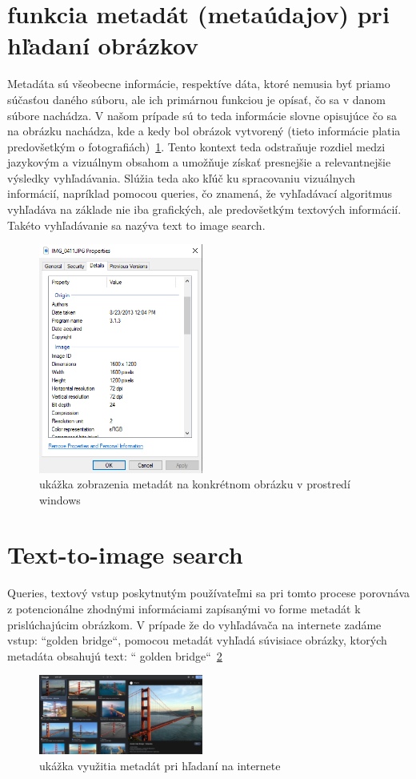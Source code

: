 \documentclass[10pt,twoside,slovak,a4paper]{article}
\begin{document}
\section{funkcia metadát (metaúdajov) pri hľadaní obrázkov} \label{02}
Metadáta sú všeobecne informácie, respektíve dáta, ktoré nemusia byť priamo súčasťou daného súboru, ale ich primárnou funkciou je opísať, čo sa v danom súbore nachádza. V našom prípade sú to teda informácie slovne opisujúce čo sa na obrázku nachádza, kde a kedy bol obrázok vytvorený (tieto informácie platia predovšetkým o fotografiách)~\ref{metadata}. Tento kontext teda odstraňuje rozdiel medzi jazykovým a vizuálnym obsahom a umožňuje získať presnejšie a relevantnejšie výsledky vyhľadávania. Slúžia teda ako kľúč ku spracovaniu vizuálnych informácií, napríklad pomocou queries, čo znamená, že vyhľadávací algoritmus vyhľadáva na základe nie iba grafických, ale predovšetkým textových informácií. Takéto vyhľadávanie sa nazýva text to image search.
\begin{figure}\label{metadata}
  \centering
  \includegraphics[width=0.48\textwidth]{images/metadata.png} 
  \caption{ukážka zobrazenia metadát na konkrétnom obrázku v prostredí windows}
\end{figure}


\section{Text-to-image search} \label{03}
Queries,  textový vstup poskytnutým používateľmi sa pri tomto procese porovnáva z potencionálne zhodnými informáciami zapísanými vo forme metadát k prislúchajúcim obrázkom. V prípade že do vyhľadávača na internete zadáme vstup: “golden bridge“, pomocou metadát vyhľadá súvisiace obrázky, ktorých metadáta obsahujú text: “ golden bridge“~\ref{metadata_google}
\begin{figure}[htb!]\label{metadata_google}
  \centering
  \includegraphics[width=0.48\textwidth]{images/metadata_google.png} 
  \caption{ukážka využitia metadát pri hľadaní na internete}
\end{figure}
\end{document}
